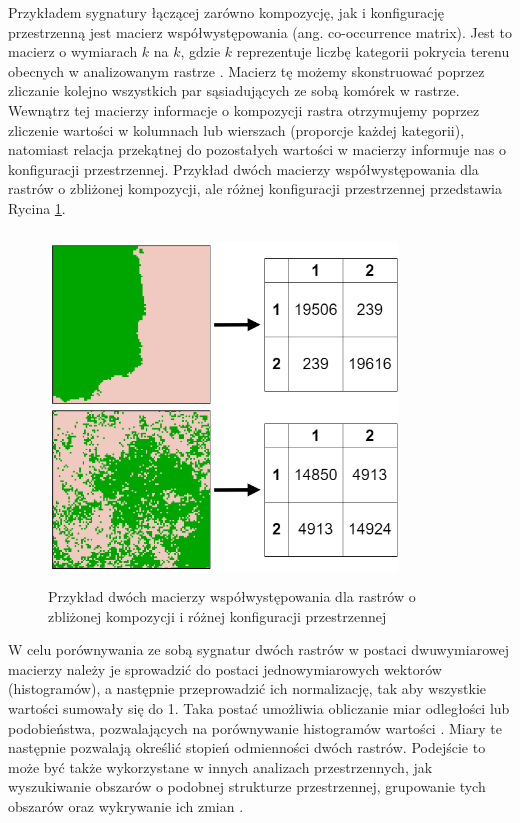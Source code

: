 \documentclass{amuthesis}
\begin{document}
Przykładem sygnatury łączącej zarówno kompozycję, jak i konfigurację
przestrzenną jest macierz współwystępowania (ang. co-occurrence matrix).
Jest to macierz o wymiarach \(k\) na \(k\), gdzie \(k\) reprezentuje
liczbę kategorii pokrycia terenu obecnych w analizowanym rastrze
\autocite{Haralick_1973,Jasiewicz_GeoPAT}. Macierz tę możemy
skonstruować poprzez zliczanie kolejno wszystkich par sąsiadujących ze
sobą komórek w rastrze. Wewnątrz tej macierzy informacje o kompozycji
rastra otrzymujemy poprzez zliczenie wartości w kolumnach lub wierszach
(proporcje każdej kategorii), natomiast relacja przekątnej do
pozostałych wartości w macierzy informuje nas o konfiguracji
przestrzennej. Przykład dwóch macierzy współwystępowania dla rastrów o
zbliżonej kompozycji, ale różnej konfiguracji przestrzennej przedstawia
Rycina \ref{fig-metody-coma}.

\begin{figure}[t]

{\centering \includegraphics[width=3.64583in,height=3.64583in]{figures/diagram_coma.png}

}

\caption{\label{fig-metody-coma}Przykład dwóch macierzy
współwystępowania dla rastrów o zbliżonej kompozycji i różnej
konfiguracji przestrzennej}

\end{figure}

W celu porównywania ze sobą sygnatur dwóch rastrów w postaci
dwuwymiarowej macierzy należy je sprowadzić do postaci jednowymiarowych
wektorów (histogramów), a następnie przeprowadzić ich normalizację, tak
aby wszystkie wartości sumowały się do 1. Taka postać umożliwia
obliczanie miar odległości lub podobieństwa, pozwalających na
porównywanie histogramów wartości \autocite{Cha2007}. Miary te następnie
pozwalają określić stopień odmienności dwóch rastrów. Podejście to może
być także wykorzystane w innych analizach przestrzennych, jak
wyszukiwanie obszarów o podobnej strukturze przestrzennej, grupowanie
tych obszarów oraz wykrywanie ich zmian
\autocite{Jasiewicz_GeoPAT,nowosad_motif}.
\end{document}
